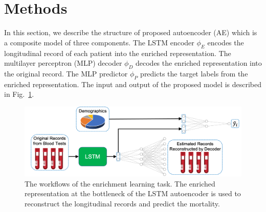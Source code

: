 \section{Methods}

In this section, we describe the structure of proposed autoencoder (AE) which is a composite model of three components. The LSTM encoder $\phi_E$ encodes the longitudinal record of each patient into the enriched representation. The multilayer perceptron (MLP) decoder $\phi_D$ decodes the enriched representation into the original record. The MLP predictor $\phi_P$ predicts the target labels from the enriched representation. The input and output of the proposed model is described in Fig.~\ref{fig: LSTM and MLP}.
\begin{figure}
    \centering
    \includegraphics[width=1.0\textwidth]{figures/network-structure.png}
    \caption{The workflows of the enrichment learning task. The enriched representation at the bottleneck of the LSTM autoencoder is used to reconstruct the longitudinal records and predict the mortality.} \label{fig: LSTM and MLP}
\end{figure}

